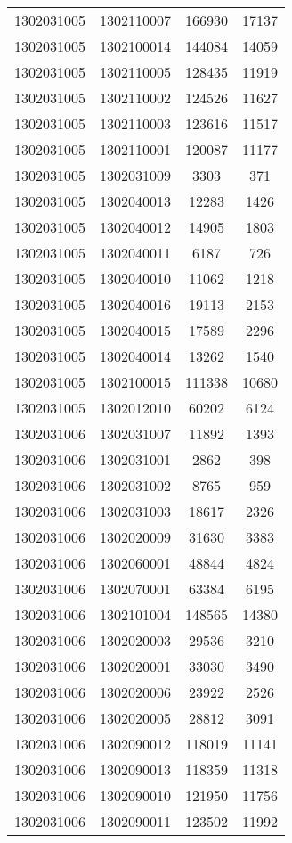 \begin{longtable}{llcc}
1302031005 & 1302110007 & 166930 & 17137\\
1302031005 & 1302100014 & 144084 & 14059\\
1302031005 & 1302110005 & 128435 & 11919\\
1302031005 & 1302110002 & 124526 & 11627\\
1302031005 & 1302110003 & 123616 & 11517\\
1302031005 & 1302110001 & 120087 & 11177\\
1302031005 & 1302031009 & 3303 & 371\\
1302031005 & 1302040013 & 12283 & 1426\\
1302031005 & 1302040012 & 14905 & 1803\\
1302031005 & 1302040011 & 6187 & 726\\
1302031005 & 1302040010 & 11062 & 1218\\
1302031005 & 1302040016 & 19113 & 2153\\
1302031005 & 1302040015 & 17589 & 2296\\
1302031005 & 1302040014 & 13262 & 1540\\
1302031005 & 1302100015 & 111338 & 10680\\
1302031005 & 1302012010 & 60202 & 6124\\
1302031006 & 1302031007 & 11892 & 1393\\
1302031006 & 1302031001 & 2862 & 398\\
1302031006 & 1302031002 & 8765 & 959\\
1302031006 & 1302031003 & 18617 & 2326\\
1302031006 & 1302020009 & 31630 & 3383\\
1302031006 & 1302060001 & 48844 & 4824\\
1302031006 & 1302070001 & 63384 & 6195\\
1302031006 & 1302101004 & 148565 & 14380\\
1302031006 & 1302020003 & 29536 & 3210\\
1302031006 & 1302020001 & 33030 & 3490\\
1302031006 & 1302020006 & 23922 & 2526\\
1302031006 & 1302020005 & 28812 & 3091\\
1302031006 & 1302090012 & 118019 & 11141\\
1302031006 & 1302090013 & 118359 & 11318\\
1302031006 & 1302090010 & 121950 & 11756\\
1302031006 & 1302090011 & 123502 & 11992\\

\end{longtable}
